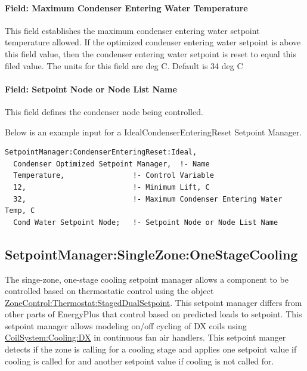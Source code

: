 \paragraph{Field: Maximum Condenser Entering Water Temperature}\label{field-maximum-condenser-entering-water-temperature}

This field establishes the maximum condenser entering water setpoint temperature allowed. If the optimized condenser entering water setpoint is above this field value, then the condenser entering water setpoint is reset to equal this filed value. The units for this field are deg C. Default is 34 deg C

\paragraph{Field: Setpoint Node or Node List Name}\label{field-setpoint-node-or-node-list-name-1}

This field defines the condenser node being controlled.

Below is an example input for a IdealCondenserEnteringReset Setpoint Manager.

\begin{lstlisting}
SetpointManager:CondenserEnteringReset:Ideal,
  Condenser Optimized Setpoint Manager,  !- Name
  Temperature,                !- Control Variable
  12,                         !- Minimum Lift, C
  32,                         !- Maximum Condenser Entering Water Temp, C
  Cond Water Setpoint Node;   !- Setpoint Node or Node List Name
\end{lstlisting}

\subsection{SetpointManager:SingleZone:OneStageCooling}\label{setpointmanagersinglezoneonestagecooling}

The singe-zone, one-stage cooling setpoint manager allows a component to be controlled based on thermostatic control using the object \hyperref[zonecontrolthermostatstageddualsetpoint]{ZoneControl:Thermostat:StagedDualSetpoint}. This setpoint manager differs from other parts of EnergyPlus that control based on predicted loads to setpoint. This setpoint manager allows modeling on/off cycling of DX coils using \hyperref[coilsystemcoolingdx]{CoilSystem:Cooling:DX} in continuous fan air handlers. This setpoint manger detects if the zone is calling for a cooling stage and applies one setpoint value if cooling is called for and another setpoint value if cooling is not called for.

